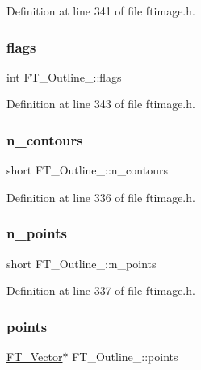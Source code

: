 Definition at line 341 of file ftimage.\+h.

\mbox{\label{struct_f_t___outline___a149765f0be0eab4fc82410cf853964bf}} 
\subsubsection{\texorpdfstring{flags}{flags}}
{\footnotesize\ttfamily int F\+T\+\_\+\+Outline\+\_\+\+::flags}



Definition at line 343 of file ftimage.\+h.

\mbox{\label{struct_f_t___outline___a0313ba9c2c51f10e6b7d7ef97bd946e2}} 
\subsubsection{\texorpdfstring{n\_contours}{n\_contours}}
{\footnotesize\ttfamily short F\+T\+\_\+\+Outline\+\_\+\+::n\+\_\+contours}



Definition at line 336 of file ftimage.\+h.

\mbox{\label{struct_f_t___outline___a7ebcf3c33231af88655534d1ac02b66e}} 
\subsubsection{\texorpdfstring{n\_points}{n\_points}}
{\footnotesize\ttfamily short F\+T\+\_\+\+Outline\+\_\+\+::n\+\_\+points}



Definition at line 337 of file ftimage.\+h.

\mbox{\label{struct_f_t___outline___a4871896a2f38bdab947e30a7cf6bca04}} 
\subsubsection{\texorpdfstring{points}{points}}
{\footnotesize\ttfamily \mbox{\hyperlink{ftimage_8h_ab158b5a7e422acb1968af95db786d018}{F\+T\+\_\+\+Vector}}$\ast$ F\+T\+\_\+\+Outline\+\_\+\+::points}



